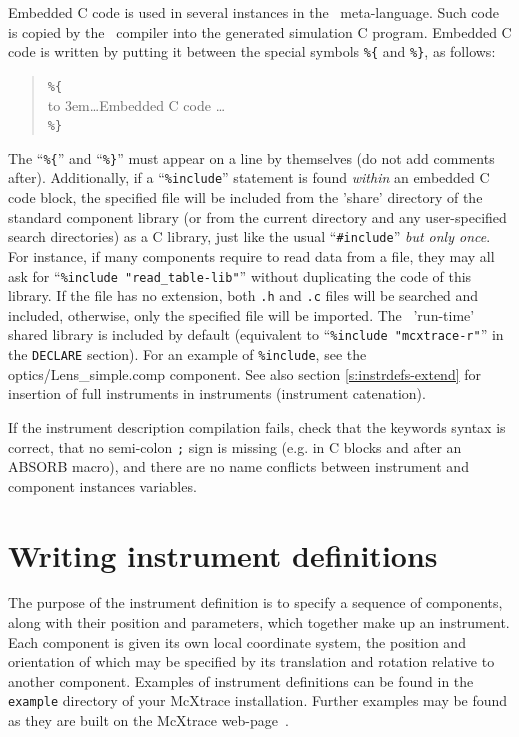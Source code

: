 Embedded C code is used in several instances in the \MCX\
meta-language. Such code is copied by the \MCX\ compiler into the
generated simulation C program. Embedded C code is written by putting it
between the special symbols \verb|%{| and \verb|%}|, as follows:
\begin{quote}
  \verb|%{| \\
  \hbox to 3em{}\ldots Embedded C code \ldots \\
  \verb|%}|
\end{quote} 
The ``\verb|%{|'' and ``\verb|%}|'' must appear on a line by themselves (do not add comments after).
Additionally, if a ``\verb+%include+'' statement is found \emph{within} an embedded C code block, the specified file will be included from the 'share' directory of the standard component library  (or from the
current directory and any user-specified search directories) as a C library, just like the usual ``\verb+#include+'' \emph{but only once}. For instance, if many components require to read data from a file, they may all ask for ``\verb+%include "read_table-lib"+''  without duplicating the code of this library. If the file has no extension, both \verb+.h+ and \verb+.c+ files will be searched and included, otherwise, only the specified file will be imported. The \MCX\ 'run-time' shared
library is included by default (equivalent to ``\verb+%include "mcxtrace-r"+'' in the \texttt{DECLARE} section). \index{Library!Run-time}
For an
example of \texttt{\%include}, see the optics/Lens\_simple.comp component. See also section \ref{s:instrdefs-extend} for insertion of full instruments in instruments (instrument catenation).

If the instrument description compilation fails, check that the
keywords syntax is correct, that no semi-colon \verb+;+ sign is
missing (e.g. in C blocks and after an ABSORB macro), and there are no name conflicts between instrument and component instances variables.


\section{Writing instrument definitions}
\label{s:instrdefs}

The purpose of the instrument definition is to specify a sequence of
components, along with their position and parameters, which together
make up an instrument. Each component is given its own local coordinate
system, the position and orientation of which may be specified by its
translation and rotation relative to another component. 
Examples of instrument definitions can be found in the \texttt{example} directory of your 
McXtrace installation. Further examples may be found as they are built on the McXtrace web-page~\cite{mcxtrace_webpage}.


